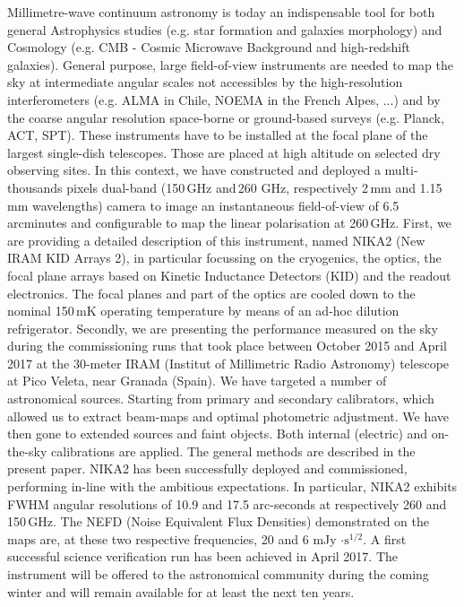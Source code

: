 \documentclass[]{aa} %
\begin{document}
  \abstract
   {Millimetre-wave continuum astronomy is today an indispensable tool for both general Astrophysics studies (e.g. star formation and galaxies morphology) and Cosmology (e.g. CMB - Cosmic Microwave Background and high-redshift galaxies). General purpose, large field-of-view instruments are needed to map the sky at intermediate angular scales not accessibles by the high-resolution interferometers (e.g. ALMA in Chile, NOEMA in the French Alpes, ...) and by the coarse angular resolution space-borne or ground-based surveys (e.g. Planck, ACT, SPT). These instruments have to be installed at the focal plane of the largest single-dish telescopes. Those are placed at high altitude on selected dry observing sites. In this context, we have constructed and deployed a multi-thousands pixels dual-band (150\,GHz and\,260 GHz, respectively 2\,mm and 1.15\,mm wavelengths) camera to image an instantaneous field-of-view of 6.5\,arcminutes and configurable to map the linear polarisation at 260\,GHz.}
   {First, we are providing a detailed description of this instrument, named NIKA2 (New IRAM KID Arrays 2), in particular focussing on the cryogenics, the optics, the focal plane arrays based on Kinetic Inductance Detectors (KID) and the readout electronics. The focal planes and part of the optics are cooled down to the nominal 150\,mK operating temperature by means of an ad-hoc dilution refrigerator. 
Secondly, we are presenting the performance measured on the sky during the commissioning runs that took place between October 2015 and April 2017 at the 30-meter IRAM (Institut of Millimetric Radio Astronomy) telescope at Pico Veleta, near Granada (Spain).}
   {We have targeted a number of astronomical sources. Starting from primary and secondary calibrators, which allowed us to extract beam-maps and optimal photometric adjustment. We have then gone to extended sources and faint objects. Both internal (electric) and on-the-sky calibrations are applied. The general methods are described in the present paper.}
   {NIKA2 has been successfully deployed and commissioned, performing in-line with the ambitious expectations. In particular, NIKA2 exhibits FWHM angular resolutions of 10.9 and 17.5 arc-seconds at respectively 260 and 150\,GHz. The NEFD (Noise Equivalent Flux Densities) demonstrated on the maps are, at these two respective frequencies, 20 and 6 mJy $\cdot\textrm{s}^{1/2}$. A first successful science verification run has been achieved in April 2017. The instrument will be offered to the astronomical community during the coming winter and will remain available for at least the next ten years.}
  {}
\end{document}
